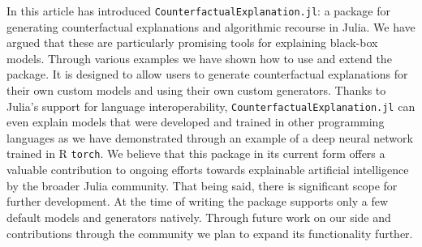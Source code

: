 \documentclass[
  letterpaper,
  DIV=11,
  numbers=noendperiod]{scrartcl}
\begin{document}
In this article has introduced \texttt{CounterfactualExplanation.jl}: a
package for generating counterfactual explanations and algorithmic
recourse in Julia. We have argued that these are particularly promising
tools for explaining black-box models. Through various examples we have
shown how to use and extend the package. It is designed to allow users
to generate counterfactual explanations for their own custom models and
using their own custom generators. Thanks to Julia's support for
language interoperability, \texttt{CounterfactualExplanation.jl} can
even explain models that were developed and trained in other programming
languages as we have demonstrated through an example of a deep neural
network trained in R \texttt{torch}. We believe that this package in its
current form offers a valuable contribution to ongoing efforts towards
explainable artificial intelligence by the broader Julia community. That
being said, there is significant scope for further development. At the
time of writing the package supports only a few default models and
generators natively. Through future work on our side and contributions
through the community we plan to expand its functionality further.
\end{document}
